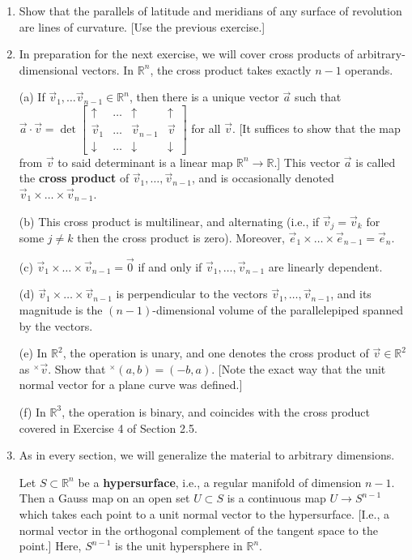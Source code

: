 \documentclass[leqno]{book}
\begin{document}
\begin{enumerate}
\item Show that the parallels of latitude and meridians of any surface of revolution are lines of curvature.  [Use the previous exercise.]

\item In preparation for the next exercise, we will cover cross products of arbitrary-dimensional vectors.  In $\mathbb R^n$, the cross product takes exactly $n-1$ operands.

(a) If $\vec v_1,\dots\vec v_{n-1}\in\mathbb R^n$, then there is a unique vector $\vec a$ such that $\vec a\cdot\vec v=\det\begin{bmatrix}\uparrow&\dots&\uparrow&\uparrow\\\vec v_1&\dots&\vec v_{n-1}&\vec v\\\downarrow&\dots&\downarrow&\downarrow\end{bmatrix}$ for all $\vec v$.  [It suffices to show that the map from $\vec v$ to said determinant is a linear map $\mathbb R^n\to\mathbb R$.]  This vector $\vec a$ is called the \textbf{cross product} of $\vec v_1,\dots,\vec v_{n-1}$, and is occasionally denoted $\vec v_1\times\dots\times\vec v_{n-1}$.

(b) This cross product is multilinear, and alternating (i.e., if $\vec v_j=\vec v_k$ for some $j\ne k$ then the cross product is zero).  Moreover, $\vec e_1\times\dots\times\vec e_{n-1}=\vec e_n$.

(c) $\vec v_1\times\dots\times\vec v_{n-1}=\vec 0$ if and only if $\vec v_1,\dots,\vec v_{n-1}$ are linearly dependent.

(d) $\vec v_1\times\dots\times\vec v_{n-1}$ is perpendicular to the vectors $\vec v_1,\dots,\vec v_{n-1}$, and its magnitude is the $(n-1)$-dimensional volume of the parallelepiped spanned by the vectors.

(e) In $\mathbb R^2$, the operation is unary, and one denotes the cross product of $\vec v\in\mathbb R^2$ as $^\times\vec v$.  Show that $^\times(a,b)=(-b,a)$.  [Note the exact way that the unit normal vector for a plane curve was defined.]

(f) In $\mathbb R^3$, the operation is binary, and coincides with the cross product covered in Exercise 4 of Section 2.5.

\item As in every section, we will generalize the material to arbitrary dimensions.

Let $S\subset\mathbb R^n$ be a \textbf{hypersurface}, i.e., a regular manifold of dimension $n-1$.  Then a Gauss map on an open set $U\subset S$ is a continuous map $U\to S^{n-1}$ which takes each point to a unit normal vector to the hypersurface.  [I.e., a normal vector in the orthogonal complement of the tangent space to the point.]  Here, $S^{n-1}$ is the unit hypersphere in $\mathbb R^n$.


\end{enumerate}
\end{document}
